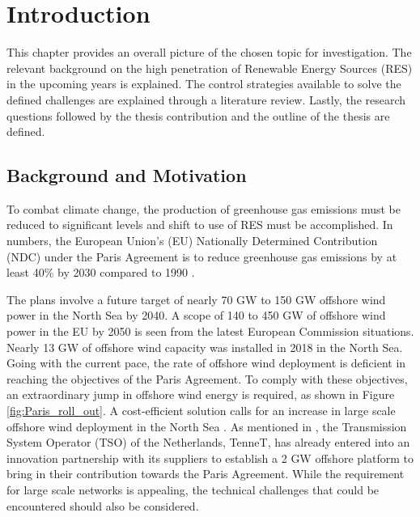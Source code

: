 \chapter{Introduction}\label{1}

This chapter provides an overall picture of the chosen topic for investigation. The relevant background on the high penetration of Renewable Energy Sources (\gls{RES}) in the upcoming years is explained. The control strategies available to solve the defined challenges are explained through a literature review. Lastly, the research questions followed by the thesis contribution and the outline of the thesis are defined. 

\section{Background and Motivation}\label{Background}

To combat climate change, the production of greenhouse gas emissions must be reduced to significant levels and shift to use of \gls{RES} must be accomplished. In numbers, the European Union's (\gls{EU}) Nationally Determined Contribution (NDC) under the Paris Agreement is to reduce greenhouse gas emissions by at least 40\% by 2030 compared to 1990 \cite{agreement2015unfccc}. 

The plans involve a future target of nearly 70 GW to 150 GW offshore wind power in the North Sea by 2040. A scope of 140 to 450 GW of offshore wind power in the \gls{EU} by 2050 is seen from the latest European Commission situations. Nearly 13 GW of offshore wind capacity was installed in 2018 in the North Sea. Going with the current pace, the rate of offshore wind deployment is deficient in reaching the objectives of the Paris Agreement. To comply with these objectives, an extraordinary jump in offshore wind energy is required, as shown in Figure \ref{fig:Paris_roll_out}. A cost-efficient solution calls for an increase in large scale offshore wind deployment in the North Sea \cite{noauthor_vision_nodate}. As mentioned in \cite{noauthor_tennet_2020}, the Transmission System Operator (TSO) of the Netherlands, TenneT, has already entered into an innovation partnership with its suppliers to establish a 2 GW offshore platform to bring in their contribution towards the Paris Agreement. While the requirement for large scale networks is appealing, the technical challenges that could be encountered should also be considered.  

